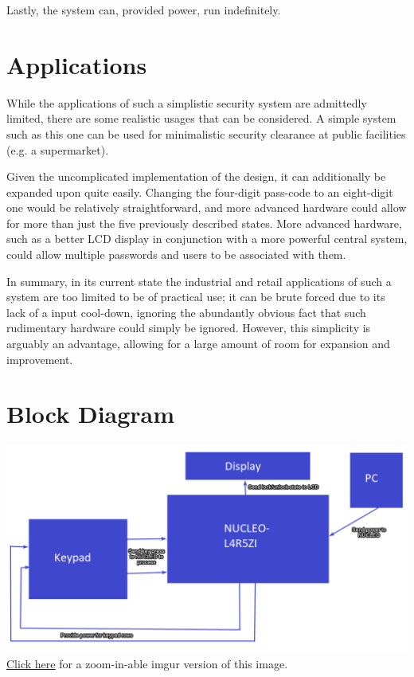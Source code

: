 \documentclass[10pt,a4paper]{article}
\begin{document}
	Lastly, the system can, provided power, run indefinitely.
	\pagebreak
	\section{Applications}
	While the applications of such a simplistic security system are admittedly limited, there are some realistic usages that can be considered. A simple system such as this one can be used for minimalistic security clearance at public facilities (e.g. a supermarket). 
	
	Given the uncomplicated implementation of the design, it can additionally be expanded upon quite easily. Changing the four-digit pass-code to an eight-digit one would be relatively straightforward, and more advanced hardware could allow for more than just the five previously described states. More advanced hardware, such as a better LCD display in conjunction with a more powerful central system, could allow multiple passwords and users to be associated with them.
	
	In summary, in its current state the industrial and retail applications of such a system are too limited to be of practical use; it can be brute forced due to its lack of a input cool-down, ignoring the abundantly obvious fact that such rudimentary hardware could simply be ignored. However, this simplicity is arguably an advantage, allowing for a large amount of room for expansion and improvement.
	\pagebreak
	\section{Block Diagram}
	\includegraphics[width=\linewidth]{Block Diagram}\\
	\href{https://i.imgur.com/veSohTk.png}{\underline{Click here}} for a zoom-in-able imgur version of this image.
	\pagebreak
\end{document}

